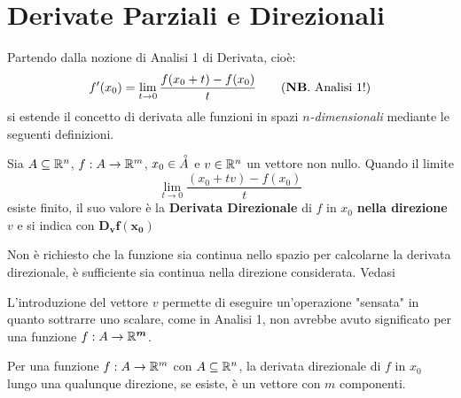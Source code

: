 \newpage
\section{Derivate Parziali e Direzionali}
Partendo dalla nozione di Analisi 1 di Derivata, cioè:
\begin{align*}
	f'(x_0) = \lim\limits_{t \to 0} \frac{f(x_0 + t) - f(x_0)}{t} \tag{\textbf{NB}. Analisi 1!}
\end{align*}
si estende il concetto di derivata alle funzioni in spazi $n$\textit{-dimensionali} mediante le seguenti definizioni.

\begin{definition}
	\label{def:deriv_direz}
	Sia $A \subseteq \mathbb{R}^n$, $f: A \to \mathbb{R}^m$, $x_0 \in \accentset{\circ}{A}$ e $v \in \mathbb{R}^n$ un vettore non nullo. Quando il limite
	\[\lim\limits_{t \to 0} \frac{(x_0 + tv) - f(x_0)}{t}\]
	esiste finito, il suo valore è la \textbf{Derivata Direzionale} di $f$ in $x_0$ \textbf{nella direzione} $v$ e si indica con $\boldsymbol{D_v f(x_0)}$
	\begin{note}
		Non è richiesto che la funzione sia continua nello spazio per calcolarne la derivata direzionale, è sufficiente sia continua nella direzione considerata. Vedasi 
	\end{note}
	\begin{note}
		L'introduzione del vettore $v$ permette di eseguire un'operazione "sensata" in quanto sottrarre uno scalare, come in Analisi 1, non avrebbe avuto significato per una funzione $f: A \to \mathbb{R}^{\boldsymbol{m}}$.
	\end{note}
	\begin{note}
		Per una funzione $f: A \to \mathbb{R}^m$ con $A \subseteq \mathbb{R}^n$, la derivata direzionale di $f$ in $x_0$ lungo una qualunque direzione, se esiste, è un vettore con $m$ componenti.
	\end{note}
\end{definition}
